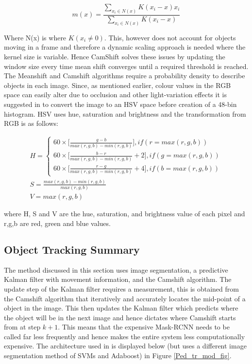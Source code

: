 \documentclass[a4paper,11pt,notitlepage]{article}
\begin{document}
\begin{equation}
m(x) = \frac{\sum_{x_{i} \in N(x)} K(x_{i} - x) x_{i}}{\sum_{x_{i} \in N(x)} K(x_{i} - x)}
\end{equation}

Where N(x) is where $K(x_{i} \neq 0)$. This, however does not account for objects moving in a frame and therefore a dynamic scaling approach is needed where the kernel size is variable. Hence CamShift \cite{Bradski98computervision} solves these issues by updating the window size every time mean shift converges until a required threshold is reached.
\newline \newline
The Meanshift and Camshift algorithms require a probability density to describe objects in each image. Since, as mentioned earlier, colour values in the RGB space can easily alter due to occlusion and other light-variation effects it is suggested in \cite{Ped_tract} to convert the image to an HSV space before creation of a 48-bin histogram. HSV uses hue, saturation and brightness and the transformation from RGB is as follows:

\begin{equation}
\begin{aligned}
H = 
\begin{cases}
    60 \times \Big[ \frac{g-b}{max(r,g,b)-min(r,g,b)} \Big] , if(r = max(r,g,b)) \\
    60 \times \Big[ \frac{b-r}{max(r,g,b)-min(r,g,b)} + 2 \Big] , if(g = max(r,g,b)) \\
    60 \times \Big[ \frac{r-g}{max(r,g,b)-min(r,g,b)} + 4 \Big] , if(b = max(r,g,b))
\end{cases} \\
S = \frac{max(r,g,b)-min(r,g,b)}{max(r,g,b)} \\
V = max(r,g,b)
\end{aligned}
\end{equation}

where H, S and V are the hue, saturation, and brightness value of each pixel and r,g,b are red, green and blue values.

\subsection{Object Tracking Summary}

The method discussed in this section uses image segmentation, a predictive Kalman filter with movement information, and the Camshift algorithm. The update step of the Kalman filter requires a measurement, this is obtained from the Camshift algorithm that iteratively and accurately locates the mid-point of a object in the image. This then updates the Kalman filter which predicts where the object will be in the next image and hence dictates where Camshift starts from at step $k+1$. This means that the expensive Mask-RCNN needs to be called far less frequently and hence makes the entire system less computationally expensive. The architecture used in \cite{Ped_tract} is displayed below (but uses a different image segmentation method of SVMs and Adaboost) in Figure \ref{Ped_tr_mod_fig}.
\end{document}

